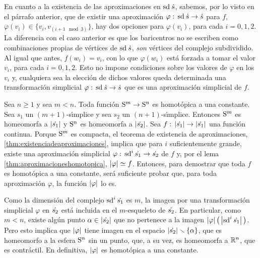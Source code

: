 \begin{ejemploAproximacionesEnElCirculoCont}
	En cuanto a la existencia de las aproximaciones en
	$\subdiv{\carasp{s}}$, sabemos, por lo visto en el p\'{a}rrafo
	anterior, que de existir una aproximaci\'{o}n
	$\varphi:\,\subdiv{\carasp{s}}\rightarrow\carasp{s}$ para $f$,
	$\varphi(v_{i})\in\{v_{i},v_{(i+1\mod 3)}\}$, hay dos opciones para
	$\varphi(v_{i})$, para cada $i=0,1,2$. La diferencia con el caso
	anterior es que los baricentros no se escriben como
	combinaciones propias de v\'{e}rtices de $\subdiv{\carasp{s}}$,
	\emph{son} v\'{e}rtices del complejo subdividido. Al igual que antes,
	$f(w_{i})=v_{i}$, con lo que $\varphi(w_{i})$ est\'{a} forzada a
	tomar el valor $v_{i}$, para cada $i=0,1,2$. Esto no impone condiciones
	sobre los valores de $\varphi$ en los $v_{i}$ y, cualquiera sea la
	elecci\'{o}n de dichos valores queda determinada una transformaci\'{o}n
	simplicial $\varphi:\,\subdiv{\carasp{s}}\rightarrow\carasp{s}$ que
	es una aproximaci\'{o}n simplicial de $f$.
\end{ejemploAproximacionesEnElCirculoCont}

\begin{ejemploFuncionesNulhomotopicasEntreEsferas}%
	\label{ejemplo:funcionesnulhomotopicasentreesferas}
	Sea $n\geq 1$ y sea $m<n$. Toda funci\'{o}n
	$\esfera{m}\rightarrow\esfera{n}$ es homot\'{o}pica a una constante.
	Sea $s_{1}$ un $(m+1)$-s\'{\i}mplice y sea $s_{2}$ un
	$(n+1)$-s\'{\i}mplice. Entonces $\esfera{m}$ es homeomorfa a
	$\geom{\carasp{s_{1}}}$ y $\esfera{n}$ es homeomorfa a
	$\geom{\carasp{s_{2}}}$. Sea
	$f:\,\geom{\carasp{s_{1}}}\rightarrow\geom{\carasp{s_{1}}}$ una
	funci\'{o}n continua. Porque $\esfera{m}$ es compacta, el teorema
	de existencia de aproximaciones, \ref{thm:existenciadeaproximaciones},
	implica que para $i$ suficientemente grande, existe una
	aproximaci\'{o}n simplicial
	$\varphi:\,\subdiv[i]{\carasp{s_{1}}}\rightarrow\carasp{s_{2}}$ de
	$f$ y, por el lema \ref{thm:aproximacioneshomotopica},
	$\geom{\varphi}\simeq f$. Entonces, para demostrar que toda $f$ es
	homot\'{o}pica a una constante, ser\'{a} suficiente probar que, para
	toda aproximaci\'{o}n $\varphi$, la funci\'{o}n $\geom{\varphi}$ lo es.

	Como la dimensi\'{o}n del complejo $\subdiv[i]{\carasp{s_{1}}}$ es
	$m$, la imagen por una transformaci\'{o}n simplicial $\varphi$ en
	$\carasp{s_{2}}$ est\'{a} incluida en el $m$-esqueleto de
	$\carasp{s_{2}}$. En particular, como $m<n$, existe alg\'{u}n punto
	$\alpha\in\geom{\carasp{s_{2}}}$ que no pertenece a la imagen
	$\geom{\varphi}\big(\geom{\subdiv[i]{\carasp{s_{1}}}}\big)$. Pero
	esto implica que $\geom{\varphi}$ tiene imagen en el espacio
	$\geom{\carasp{s_{2}}}\setmin\{\alpha\}$, que es homeomorfo a la
	esfera $\esfera{n}$ sin un punto, que, a su vez, es homeomorfa a
	$\bb{R}^{n}$, que es contr\'{a}ctil. En definitiva, $\geom{\varphi}$
	es homot\'{o}pica a una constante.
\end{ejemploFuncionesNulhomotopicasEntreEsferas}

